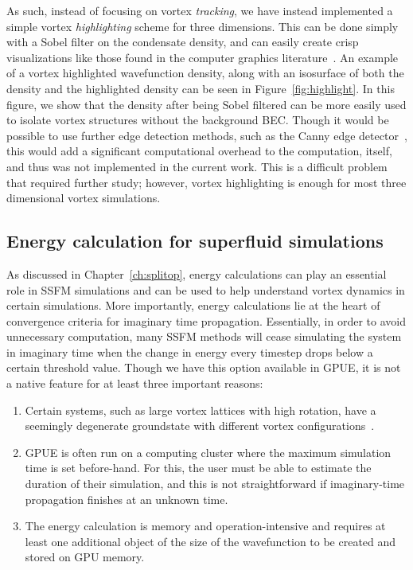 As such, instead of focusing on vortex \textit{tracking}, we have instead implemented a simple vortex \textit{highlighting} scheme for three dimensions.
This can be done simply with a Sobel filter on the condensate density, and can easily create crisp visualizations like those found in the computer graphics literature~\cite{guo2018}.
An example of a vortex highlighted wavefunction density, along with an isosurface of both the density and the highlighted density can be seen in Figure~\ref{fig:highlight}.
In this figure, we show that the density after being Sobel filtered can be more easily used to isolate vortex structures without the background BEC.
Though it would be possible to use further edge detection methods, such as the Canny edge detector~\cite{canny1986}, this would add a significant computational overhead to the computation, itself, and thus was not implemented in the current work.
This is a difficult problem that required further study; however, vortex highlighting is enough for most three dimensional vortex simulations.

\subsection{Energy calculation for superfluid simulations}

As discussed in Chapter~\ref{ch:splitop}, energy calculations can play an essential role in SSFM simulations and can be used to help understand vortex dynamics in certain simulations.
More importantly, energy calculations lie at the heart of convergence criteria for imaginary time propagation.
Essentially, in order to avoid unnecessary computation, many SSFM methods will cease simulating the system in imaginary time when the change in energy every timestep drops below a certain threshold value.
Though we have this option available in GPUE, it is not a native feature for at least three important reasons:

\begin{enumerate}
\item Certain systems, such as large vortex lattices with high rotation, have a seemingly degenerate groundstate with different vortex configurations~\cite{o2017, o2016, o2016topo}.
\item GPUE is often run on a computing cluster where the maximum simulation time is set before-hand.
For this, the user must be able to estimate the duration of their simulation, and this is not straightforward if imaginary-time propagation finishes at an unknown time.
\item The energy calculation is memory and operation-intensive and requires at least one additional object of the size of the wavefunction to be created and stored on GPU memory.
\end{enumerate}

